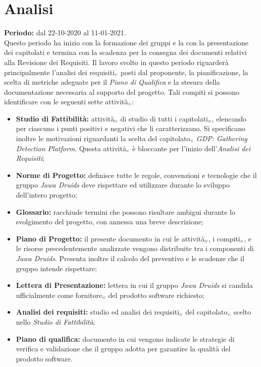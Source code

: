 \section{Analisi}\label{PianificazioneAnalisi}
\textbf{Periodo:} dal 22-10-2020 al 11-01-2021.\\
Questo periodo ha inizio con la formazione dei gruppi e la con la presentazione dei capitolati e termina con la scadenza per la consegna dei documenti relativi alla Revisione dei Requisiti.
Il lavoro svolto in questo periodo riguarderà principalmente l'analisi dei requisiti$_{\scaleto{G}{3pt}}$ posti dal proponente, la pianificazione, la scelta di metriche adeguate per il \textit{Piano di Qualifica} e la stesura della documentazione necessaria al supporto del progetto.
Tali compiti si possono identificare con le seguenti sette attività$_{\scaleto{G}{3pt}}$:
\begin{itemize}
	\item \textbf{Studio di Fattibilità:} attività$_{\scaleto{G}{3pt}}$ di studio di tutti i capitolati$_{\scaleto{G}{3pt}}$, elencando per ciascuno i punti positivi e negativi che li caratterizzano. Si specificano inoltre le motivazioni riguardanti la scelta del capitolato$_{\scaleto{G}{3pt}}$ \textit{GDP: Gathering Detection Platform}.
	Questa attività$_{\scaleto{G}{3pt}}$ è bloccante per l'inizio dell'\textit{Analisi dei Requisiti};
	\item \textbf{Norme di Progetto:} definisce tutte le regole, convenzioni e tecnologie che il gruppo \textit{Jawa Druids} deve rispettare ed utilizzare durante lo sviluppo dell'intero progetto;
	\item \textbf{Glossario:} racchiude termini che possono risultare ambigui durante lo svolgimento del progetto, con annessa una breve descrizione;
	\item \textbf{Piano di Progetto:} il presente documento in cui le attività$_{\scaleto{G}{3pt}}$, i compiti$_{\scaleto{G}{3pt}}$, e le risorse precedentemente analizzate vengono distribuite tra i componenti di \textit{Jawa Druids}. Presenta inoltre il calcolo del preventivo e le scadenze che il gruppo intende rispettare;
	\item \textbf{Lettera di Presentazione:} lettera in cui il gruppo \textit{Jawa Druids} si candida ufficialmente come fornitore$_{\scaleto{G}{3pt}}$ del prodotto software richiesto;
	\item \textbf{Analisi dei requisiti:} studio ed analisi dei requisiti$_{\scaleto{G}{3pt}}$ del capitolato$_{\scaleto{G}{3pt}}$ scelto nello \textit{Studio di Fattibilità};
	\item \textbf{Piano di qualifica:} documento in cui vengono indicate le strategie di verifica e validazione che il gruppo adotta per garantire la qualità del prodotto software.
\end{itemize}
